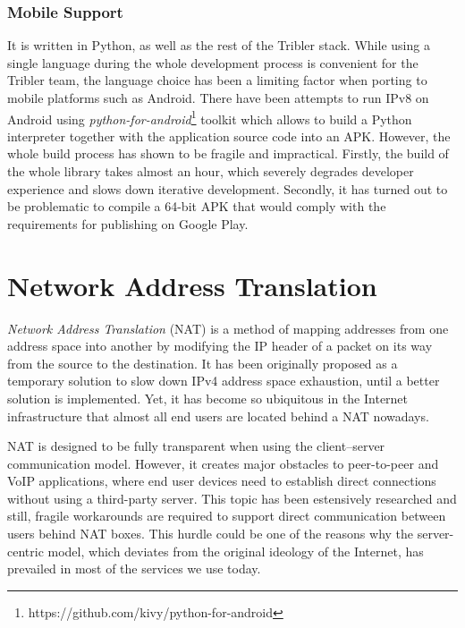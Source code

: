 
\subsubsection{Mobile Support}
It is written in Python, as well as the rest of the Tribler stack. While using a single language during the whole development process is convenient for the Tribler team, the language choice has been a limiting factor when porting to mobile platforms such as Android. There have been attempts to run IPv8 on Android using \textit{python-for-android}\footnote{https://github.com/kivy/python-for-android} toolkit which allows to build a Python interpreter together with the application source code into an APK. However, the whole build process has shown to be fragile and impractical. Firstly, the build of the whole library takes almost an hour, which severely degrades developer experience and slows down iterative development. Secondly, it has turned out to be problematic to compile a 64-bit APK that would comply with the requirements for publishing on Google Play.

\section{Network Address Translation}

\textit{Network Address Translation} (NAT) is a method of mapping addresses from one address space into another by modifying the IP header of a packet on its way from the source to the destination. It has been originally proposed as a temporary solution to slow down IPv4 address space exhaustion, until a better solution is implemented. \cite{nat} Yet, it has become so ubiquitous in the Internet infrastructure that almost all end users are located behind a NAT nowadays.

NAT is designed to be fully transparent when using the client–server communication model. However, it creates major obstacles to peer-to-peer and VoIP applications, where end user devices need to establish direct connections without using a third-party server. This topic has been estensively researched and still, fragile workarounds are required to support direct communication between users behind NAT boxes. This hurdle could be one of the reasons why the server-centric model, which deviates from the original ideology of the Internet, has prevailed in most of the services we use today.

